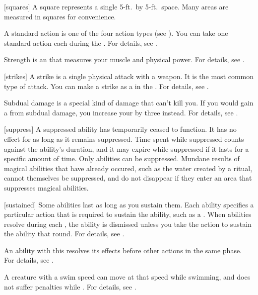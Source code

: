 [squares] A square represents a single 5-ft.\ by 5-ft.\ space.
Many areas are measured in squares for convenience.

 A standard action is one of the four action types (see ).
You can take one standard action each  during the .
For details, see .

 Strength is an  that measures your muscle and physical power.
For details, see .

[strikes] A strike is a single physical attack with a weapon.
It is the most common type of attack.
You can make a strike as a  in the .
For details, see .

 Subdual damage is a special kind of damage that can't kill you.
If you would gain a  from subdual damage, you increase your  by three instead.
For details, see .

[suppress] A suppressed ability has temporarily ceased to function.
It has no effect for as long as it remains suppressed.
Time spent while suppressed counts against the ability's duration, and it may expire while suppressed if it lasts for a specific amount of time.
Only \magical abilities can be suppressed.
Mundane results of magical abilities that have already occured, such as the water created by a  ritual, cannot themselves be suppressed, and do not disappear if they enter an area that suppresses magical abilities.

[sustained] Some abilities last as long as you sustain them.
Each ability specifies a particular action that is required to sustain the ability, such as a .
When  abilities resolve during each , the ability is dismissed unless you take the action to sustain the ability that round.
For details, see .

 An ability with this  resolves its effects before other actions in the same phase.
For details, see .

 A creature with a swim speed can move at that speed while swimming, and does not suffer penalties while \submerged.
For details, see .

